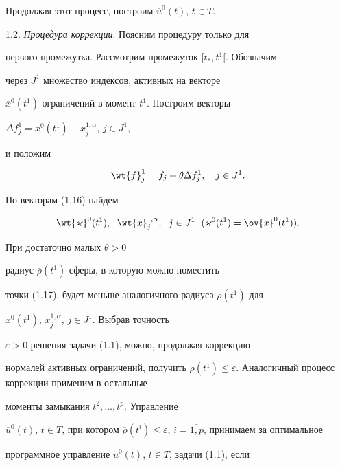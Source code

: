 Продолжая этот процесс, построим $\overline{u}^0(t)$, $t \in T$.


\medskip





1.2. {\it Процедура коррекции}. Поясним процедуру только для


первого промежутка. Рассмотрим промежуток $[t_*,t^1[$. Обозначим


через $J^1$ множество индексов, активных на векторе


$\overline{x}^0(t^1)$ ограничений в момент $t^1$. Построим векторы


$\Delta f^{1}_{j}=\overline{x}^0(t^1)-x^{1,\alpha}_j$, $j \in J^1 $,


и положим


\begin{equation}


\wt{f}_{j}^{1}=f_{j}+\theta\Delta f_{j}^{1},\quad j \in J^1.


\end{equation}


По векторам (1.16) найдем


\begin{equation}


\wt{\varkappa}^{0}(t^1),\ \; \wt{x}^{1,\alpha}_j,\ \; j \in


J^1 \ \;(\varkappa^{0}(t^1)=\ov{x}^{0}(t^1)).


\end{equation}


При достаточно малых $\theta > 0$


радиус $\overline{\rho}(t^1)$ сферы, в которую можно поместить


точки (1.17), будет меньше аналогичного радиуса $\rho(t^1)$ для


$\overline{x}^0(t^1)$, $x^{1,\alpha}_j$, $j \in J^1$. Выбрав точность


$\varepsilon > 0$ решения задачи (1.1), можно, продолжая коррекцию


нормалей активных ограничений, получить $\overline{\rho}(t^1) \le


\varepsilon $. Аналогичный процесс коррекции применим в остальные


моменты замыкания $t^2, \dotsc, t^p$. Управление


$\overline{u}^0(t)$, $t \in T$, при котором $\overline{\rho}(t^i)


\le \varepsilon$, $i=\overline{1,p}$, принимаем за оптимальное


программное управление $u^0(t)$, $t \in T$, задачи (1.1), если


